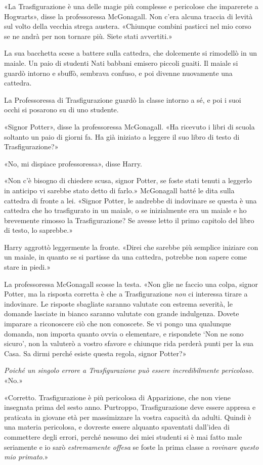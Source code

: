 «La Trasfigurazione è una delle magie più complesse e pericolose che imparerete a Hogwarts», disse la professoressa McGonagall. Non c’era alcuna traccia di levità sul volto della vecchia strega austera. «Chiunque combini pasticci nel mio corso se ne andrà per non tornare più. Siete stati avvertiti.»

La sua bacchetta scese a battere sulla cattedra, che dolcemente si rimodellò in un maiale. Un paio di studenti Nati babbani emisero piccoli guaiti. Il maiale si guardò intorno e sbuffò, sembrava confuso, e poi divenne nuovamente una cattedra.

La Professoressa di Trasfigurazione guardò la classe intorno a sé, e poi i suoi occhi si posarono su di uno studente.

«Signor Potter», disse la professoressa McGonagall. «Ha ricevuto i libri di scuola soltanto un paio di giorni fa. Ha già iniziato a leggere il suo libro di testo di Trasfigurazione?»

«No, mi dispiace professoressa», disse Harry.

«Non c’è bisogno di chiedere scusa, signor Potter, se foste stati tenuti a leggerlo in anticipo vi sarebbe stato detto di farlo.» McGonagall batté le dita sulla cattedra di fronte a lei. «Signor Potter, le andrebbe di indovinare se questa è una cattedra che ho trasfigurato in un maiale, o se inizialmente era un maiale e ho brevemente rimosso la Trasfigurazione? Se avesse letto il primo capitolo del libro di testo, lo saprebbe.»

Harry aggrottò leggermente la fronte. «Direi che sarebbe più semplice iniziare con un maiale, in quanto se si partisse da una cattedra, potrebbe non sapere come stare in piedi.»

La professoressa McGonagall scosse la testa. «Non glie ne faccio una colpa, signor Potter, ma la risposta corretta è che a Trasfigurazione \textit{non} ci interessa tirare a indovinare. Le risposte sbagliate saranno valutate con estrema severità, le domande lasciate in bianco saranno valutate con grande indulgenza. Dovete imparare a riconoscere ciò che non conoscete. Se vi pongo una qualunque domanda, non importa quanto ovvia o elementare, e rispondete ‘Non ne sono sicuro’, non la valuterò a vostro sfavore e chiunque rida perderà punti per la sua Casa. Sa dirmi perché esiste questa regola, signor Potter?»

\textit{Poiché un singolo errore a Trasfigurazione può essere incredibilmente pericoloso.} «No.»

«Corretto. Trasfigurazione è più pericolosa di Apparizione, che non viene insegnata prima del sesto anno. Purtroppo, Trasfigurazione deve essere appresa e praticata in giovane età per massimizzare la vostra capacità da adulti. Quindi è una materia pericolosa, e dovreste essere alquanto spaventati dall’idea di commettere degli errori, perché nessuno dei miei studenti si è mai fatto male seriamente e io sarò \textit{estremamente offesa} se foste la prima classe a \textit{rovinare questo mio primato}.»

